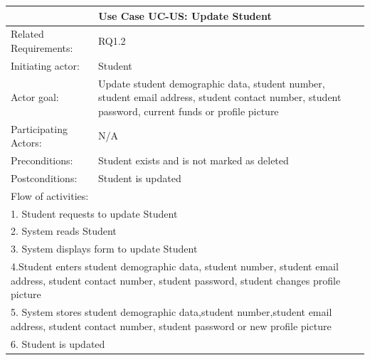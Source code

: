 \documentclass[12pt]{article}
\begin{document}
{		\begin{tabular}{| l | p{10cm}| }
			\hline\multicolumn{2}{|c|}{ \textbf{Use Case UC-US: Update Student}} \\ \hline
			Related Requirements: & RQ1.2\\ \hline
			Initiating actor: & Student \\ \hline
			Actor goal: & Update student demographic data, student number, student email address, student contact number, student password, current funds or profile picture\\ \hline
			Participating Actors: & N/A\\ \hline
			Preconditions: & Student exists and is not marked as deleted\\ \hline
			Postconditions: & Student is updated\\ \hline
			\multicolumn{2}{|l|}{Flow of activities:}\\ \hline
			\multicolumn{2}{|p{15cm}|}{1. Student requests to update Student}\\
			\multicolumn{2}{|p{15cm}|}{2. System reads Student}\\
			\multicolumn{2}{|p{15cm}|}{3. System displays form to update Student}\\
			\multicolumn{2}{|p{15cm}|}{4.Student enters student demographic data, student number, student email address, student contact number, student password, student changes profile picture}	\\
			\multicolumn{2}{|p{15cm}|}{5. System stores student demographic data,student number,student email address, student contact number, student password or new profile picture}\\
			\multicolumn{2}{|l|}{6. Student is updated}
			\\ \hline
		\end{tabular}





		\begin{tabular}{| l | l| }


\end{tabular}}
\end{document}
